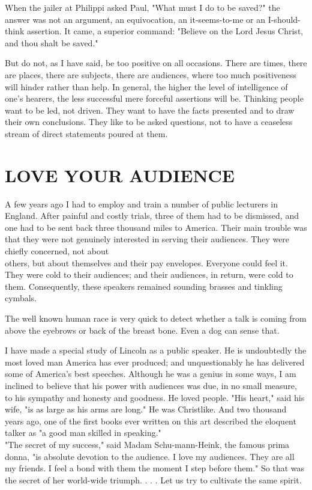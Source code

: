 \documentclass[10pt]{article}
\begin{document}
When the jailer at Philippi asked Paul, "What must I do to be saved?" the answer was not an argument, an equivocation, an it-seems-to-me or an I-should-think assertion. It came, a superior command: "Believe on the Lord Jesus Christ, and thou shalt be saved."

But do not, as I have said, be too positive on all occasions. There are times, there are places, there are subjects, there are audiences, where too much positiveness will hinder rather than help. In general, the higher the level of intelligence of one's hearers, the less successful mere forceful assertions will be. Thinking people want to be led, not driven. They want to have the facts presented and to draw their own conclusions. They like to be asked questions, not to have a ceaseless stream of direct statements poured at them.

\section*{LOVE YOUR AUDIENCE}
A few years ago I had to employ and train a number of public lecturers in England. After painful and costly trials, three of them had to be dismissed, and one had to be sent back three thousand miles to America. Their main trouble was that they were not genuinely interested in serving their audiences. They were chiefly concerned, not about\\
others, but about themselves and their pay envelopes. Everyone could feel it. They were cold to their audiences; and their audiences, in return, were cold to them. Consequently, these speakers remained sounding brasses and tinkling cymbals.

The well known human race is very quick to detect whether a talk is coming from above the eyebrows or back of the breast bone. Even a dog can sense that.

I have made a special study of Lincoln as a public speaker. He is undoubtedly the most loved man America has ever produced; and unquestionably he has delivered some of America's best speeches. Although he was a genius in some ways, I am inclined to believe that his power with audiences was due, in no small measure, to his sympathy and honesty and goodness. He loved people. "His heart," said his wife, "is as large as his arms are long." He was Christlike. And two thousand years ago, one of the first books ever written on this art described the eloquent talker as "a good man skilled in speaking."\\
"The secret of my success," said Madam Schu-mann-Heink, the famous prima donna, "is absolute devotion to the audience. I love my audiences. They are all my friends. I feel a bond with them the moment I step before them." So that was the secret of her world-wide triumph. . . . Let us try to cultivate the same spirit.
\end{document}
